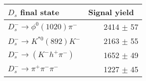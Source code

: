  \begin{tabular}{l r }
\hline\hline
$D_s$ final state  & Signal yield\ \\
\hline
$D_{s}^{-} \to \phi^{0}(1020)\pi^{-}$ & 2414 $\pm$ 57 \\
$D_{s}^{-}\to K^{*0}(892)K^{-}$ & 2163 $\pm$ 55 \\
$D_{s}^{-}\to (K^{-}h^{+}\pi^{-})$ & 1652 $\pm$ 49 \\
$D_{s}^{-}\to \pi^{+}\pi^{-}\pi^{-}$ & 1227 $\pm$ 45 \\
\hline\hline
\end{tabular}
\label{table:signalYieldsDs}
